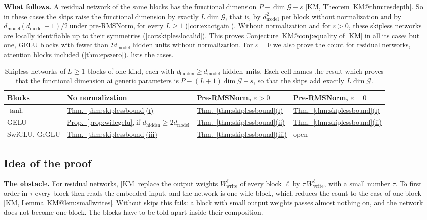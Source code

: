 \documentclass[10pt]{article}
\makeatletter
\theoremstyle{definition}
\theoremstyle{remark}
\newcommand{\Wwrite}{W_{\mathrm{write}}}
\newcommand{\dm}{d_{\mathrm{model}}}
\newcommand{\dhid}{d_{\mathrm{hidden}}}
\newcommand{\G}{\mathcal{G}}
\newcommand{\para}[1]{\smallskip\noindent\textbf{#1}\hspace{0.5em}}
\newcommand{\KMn}[1]{\csname KM@#1\endcsname}
\newcommand{\KM}[2]{[KM, #1~\KMn{#2}]}
\makeatother
\begin{document}
\para{What follows.} A residual network of the same blocks has the functional dimension $P - \dim\G - s$ \KM{Theorem}{thm:resdepth}. So in these cases the skips raise the functional dimension by exactly $L\dim\G$, that is, by $\dm^2$ per block without normalization and by $\dm(\dm-1)/2$ under pre-RMSNorm, for every $L \ge 1$ (\cref{cor:exactgain}). Without normalization and for $\varepsilon > 0$, these skipless networks are locally identifiable up to their symmetries (\cref{cor:skiplesslocalid}). This proves Conjecture~\KMn{conj:equality} of [KM] in all its cases but one, GELU blocks with fewer than $2\dm$ hidden units without normalization. For $\varepsilon = 0$ we also prove the count for residual networks, attention blocks included (\cref{thm:epszero}).  lists the cases.

\begin{table}[t]
\centering\small
\renewcommand{\arraystretch}{1.15}\setlength{\tabcolsep}{5pt}
\newcommand{\tref}[3]{\hyperref[#2:#3]{#1~\ref*{#2}(#3)}}
\begin{tabular}{@{}llll@{}}
\toprule
\textbf{Blocks} & \textbf{No normalization} & \textbf{Pre-RMSNorm, $\varepsilon > 0$} & \textbf{Pre-RMSNorm, $\varepsilon = 0$} \\
\midrule
$\tanh$ & \tref{Thm.}{thm:skiplessbound}{i} & \tref{Thm.}{thm:skiplessbound}{i} & \tref{Thm.}{thm:skiplessbound}{i} \\
GELU & \hyperref[prop:widegelu]{Prop.~\ref*{prop:widegelu}}, if $\dhid \ge 2\dm$ & \tref{Thm.}{thm:skiplessbound}{ii} & \tref{Thm.}{thm:skiplessbound}{ii} \\
SwiGLU, GeGLU & \tref{Thm.}{thm:skiplessbound}{iii} & \tref{Thm.}{thm:skiplessbound}{iii} & open \\
\bottomrule
\end{tabular}
\caption{Skipless networks of $L \ge 1$ blocks of one kind, each with $\dhid \ge \dm$ hidden units. Each cell names the result which proves that the functional dimension at generic parameters is $P - (L+1)\dim\G - s$, so that the skips add exactly $L\dim\G$.}
\label{tab:cases}
\end{table}

\subsection{Idea of the proof}\label{sec:idea}

\para{The obstacle.} For residual networks, [KM] replace the output weights $\Wwrite^{\ell}$ of every block $\ell$ by $\tau\,\Wwrite^{\ell}$, with a small number $\tau$. To first order in $\tau$ every block then reads the embedded input, and the network is one wide block, which reduces the count to the case of one block \KM{Lemma}{lem:smallwrites}. Without skips this fails: a block with small output weights passes almost nothing on, and the network does not become one block. The blocks have to be told apart inside their composition.
\end{document}
